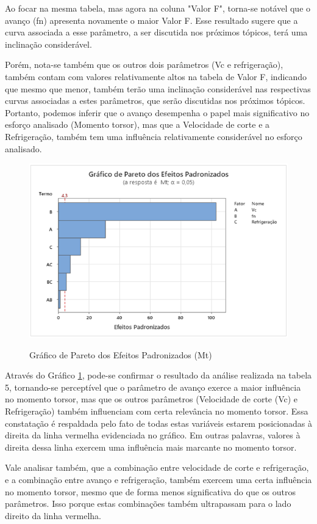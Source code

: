\documentclass[deposito, acronym, symbols]{fei}
\begin{document}
Ao focar na mesma tabela, mas agora na coluna "Valor F", torna-se notável que o avanço (fn) apresenta novamente o maior Valor F. Esse resultado sugere que a curva associada a esse parâmetro, a ser discutida nos próximos tópicos, terá uma inclinação considerável.

Porém, nota-se também que os outros dois parâmetros (Vc e refrigeração), também contam com valores relativamente altos na tabela de Valor F, indicando que mesmo que menor, também terão uma inclinação considerável nas respectivas curvas associadas a estes parâmetros, que serão discutidas nos próximos tópicos.
Portanto, podemos inferir que o avanço desempenha o papel mais significativo no esforço analisado (Momento torsor), mas que a Velocidade de corte e a Refrigeração, também tem uma influência relativamente considerável no esforço analisado.

\begin{figure}[!htp]
    \centering
    \caption{Gráfico de Pareto dos Efeitos Padronizados (Mt)}
    \includegraphics[width=0.8\linewidth]{Imagens/pareta 2.png}
    \label{fig:par2}
\end{figure}

Através do Gráfico \ref{fig:par2}, pode-se confirmar o resultado da análise realizada na tabela 5, tornando-se perceptível que o parâmetro de avanço exerce a maior influência no momento torsor, mas que os outros parâmetros (Velocidade de corte (Vc) e Refrigeração) também influenciam com certa relevância no momento torsor. Essa constatação é respaldada pelo fato de todas estas variáveis estarem posicionadas à direita da linha vermelha evidenciada no gráfico. Em outras palavras, valores à direita dessa linha exercem uma influência mais marcante no momento torsor. 

Vale analisar também, que a combinação entre velocidade de corte e refrigeração, e a combinação entre avanço e refrigeração, também exercem uma certa influência no momento torsor, mesmo que de forma menos significativa do que os outros parâmetros. Isso porque estas combinações também ultrapassam para o lado direito da linha vermelha.
\end{document}

